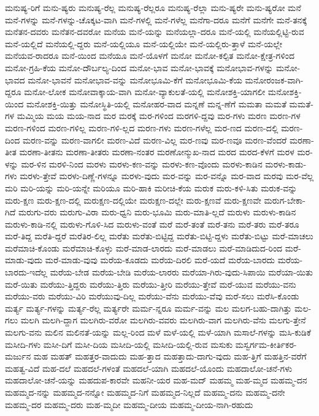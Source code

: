 {ಮನುಷ್ಯ-ರಿಗೆ
ಮನು-ಷ್ಯರು
ಮನುಷ್ಯ-ರೆಲ್ಲ
ಮನುಷ್ಯ-ರೆಲ್ಲರೂ
ಮನುಷ್ಯ-ರೆಲ್ಲಾ
ಮನು-ಷ್ಯರೇ
ಮನು-ಷ್ಯರೋ
ಮನೆ
ಮನೆ-ಗಳನ್ನು
ಮನೆ-ಗಳನ್ನು-ಚೊಕ್ಕಟ-ವಾಗಿ
ಮನೆ-ಗಳಲ್ಲಿ
ಮನೆ-ಗಳೆಲ್ಲ
ಮನೆಗಾ-ದರೂ
ಮನೆಗೆ
ಮನೆಗೇ
ಮನೆ-ತನಕ್ಕೆ
ಮನೆತನ-ದವರು
ಮನೆತನ-ದವರೋ
ಮನೆಯ
ಮನೆ-ಯನ್ನು
ಮನೆಯಲ್ಲಾ-ದರೂ
ಮನೆ-ಯಲ್ಲಿ
ಮನೆಯಲ್ಲಿಟ್ಟಿ-ರುವ
ಮನೆ-ಯಲ್ಲಿದೆ
ಮನೆಯಲ್ಲಿ-ದ್ದರು
ಮನೆ-ಯಲ್ಲಿಯೂ
ಮನೆ-ಯಲ್ಲಿಯೇ
ಮನೆ-ಯಲ್ಲಿರು-ತ್ತಾಳೆ
ಮನೆ-ಯಲ್ಲೇ
ಮನೆಯವ-ರಾದರೂ
ಮನೆ-ಯಿಂದ
ಮನೆಯೂ
ಮನೆ-ಯೊಳಗೆ
ಮನೋ
ಮನೋ-ಕಲ್ಪಿತ
ಮನೋ-ಕ್ಷೇತ್ರ-ಗಳಿಂದ
ಮನೋ-ಗ್ರಹಿ-ಕೆಯ
ಮನೋ-ದೌರ್ಬಲ್ಯ-ದಿಂದ
ಮನೋ-ಭಾವ
ಮನೋ-ಭಾವಕ್ಕೆ
ಮನೋಭಾವ-ಗಳನ್ನು
ಮನೋ-ಭಾವದ
ಮನೋ-ಭಾವನೆ
ಮನೋಭಾವ-ವನ್ನು
ಮನೋಭೂಮಿ-ಕೆಗೆ
ಮನೋಭೂಮಿ-ಕೆಯ
ಮನೋರಂಜಕ-ವಾಗಿ-ದ್ದರೂ
ಮನೋ-ಲೋಕ
ಮನೋವಾಕ್ಕಾಯ-ವಾಗಿ
ಮನೋ-ವ್ಯಾಕುಲತೆ-ಯಲ್ಲಿ
ಮನೋಶಕ್ತಿ-ಯಾಗಲೀ
ಮನೋಶಕ್ತಿ-ಯಿಂದ
ಮನೋಶಕ್ತಿ-ಯಿತ್ತು
ಮನೋಸ್ಥಿತಿ-ಯಲ್ಲಿ
ಮನೋಹರ-ವಾದ
ಮನ್ನಣೆ
ಮನ್ನ-ಣೆಗೆ
ಮಮತಾ
ಮಮತೆ
ಮಮತೆ-ಗಳ
ಮಮ್ಮಿಯ
ಮಯ
ಮಯ-ನಾದ
ಮರ
ಮರಕ್ಕೆ
ಮರ-ಗಳಿಂದ
ಮರಗಳಿ-ದ್ದವು
ಮರ-ಗಳು
ಮರಣ
ಮರಣ-ಗಳ
ಮರಣ-ಗಳಿಂದ
ಮರಣ-ಗಳಿಲ್ಲ
ಮರಣ-ಗಳಿ-ಲ್ಲದ
ಮರಣ-ಗಳು
ಮರಣ-ಗಳೆಲ್ಲ
ಮರ-ಣದ
ಮರಣ-ದಲ್ಲಿ
ಮರಣ-ದಿಂದ
ಮರಣ-ವನ್ನು
ಮರಣ-ವಾಗಲೀ
ಮರಣ-ವಿದೆ
ಮರಣ-ವಿಲ್ಲ
ಮರ-ಣವು
ಮರ-ಣವೂ
ಮರಣ-ವೆಂದರೆ
ಮರಣಾ-ತೀತ
ಮರಣಾ-ತೀತನು
ಮರಣಾ-ತೀತರು
ಮರಣಾ-ನಂತರ
ಮರಣೋನ್ಮುಖ-ನಾದ
ಮರದ
ಮರದ-ಕೆಳಗೆ
ಮರಳ
ಮರ-ಳನ್ನು
ಮರ-ಳಿನ
ಮರಳಿ-ನಿಂದ
ಮರಳು
ಮರಳು-ಕಣ-ವನ್ನು
ಮರಳು-ಕಣ-ವೊಂದು
ಮರಳು-ಕಾಡಿನ
ಮರಳು-ಕಾಡು-ಗಳು
ಮರಳು-ತ್ತೇವೆ
ಮರಳು-ದಿಣ್ಣೆ-ಗಳನ್ನೂ
ಮರಳು-ವುದು
ಮರ-ವನ್ನು
ಮರ-ವನ್ನೊ
ಮರ-ವಾದ
ಮರವು
ಮರ-ವೆಲ್ಲ
ಮರಿ
ಮರಿ-ಯನ್ನು
ಮರಿ-ಯನ್ನೇ
ಮರಿಯೂ
ಮರಿ-ಹಾಕಿ
ಮರೀಚಿ-ಕೆಯ
ಮರುಕ
ಮರು-ಕಳಿ-ಸಿತು
ಮರುಕ-ವನ್ನು
ಮರು-ಕ್ಷಣ
ಮರು-ಕ್ಷಣ-ದಲ್ಲಿ
ಮರುಕ್ಷಣ-ದಲ್ಲಿಯೇ
ಮರುಕ್ಷಣ-ದಲ್ಲೇ
ಮರು-ಕ್ಷಣವೆ
ಮರು-ಕ್ಷಣವೇ
ಮರುಗ-ಬೇಕಾ-ಗಿದೆ
ಮರುಗು-ವರು
ಮರುಗು-ವಿರಾ
ಮರು-ಧ್ವನಿ
ಮರು-ಭೂಮಿ
ಮರು-ಮಾತಿ-ಲ್ಲದೆ
ಮರುಳು
ಮರುಳು-ಕಾಡಿನ
ಮರುಳು-ಕಾಡಿ-ನಲ್ಲಿ
ಮರುಳು-ಗೊಳಿ-ಸಿದ
ಮರುಳು-ವಂತೆ
ಮರೆ
ಮರೆ-ತಂತೆ
ಮರೆ-ತನು
ಮರೆ-ತರು
ಮರೆ-ತರೂ
ಮರೆ-ತಿದ್ದ
ಮರೆತಿ-ದ್ದರೆ
ಮರೆತಿರ-ಲಿಲ್ಲ
ಮರೆತು
ಮರೆತು-ಬಿಟ್ಟಿದ್ದ
ಮರೆತು-ಬಿಟ್ಟಿ-ದ್ದಳು
ಮರೆತು-ಬಿಟ್ಟು
ಮರೆ-ಮಾಚಲು
ಮರೆಮಾಚಿ-ಕೊಂಡು
ಮರೆಮಾಚಿ-ಕೊಳ್ಳು
ಮರೆ-ಮಾಡ-ಲಾರದು
ಮರೆ-ಮಾಡಲು
ಮರೆ-ಮಾಡಿದುದ-ರಿಂದ
ಮರೆ-ಮಾಡು-ವುದು
ಮರೆ-ಮಾಡು-ವುವು
ಮರೆಯ-ಕೂಡದು
ಮರೆಯ-ದಿರಲಿ
ಮರೆ-ಯದೆ
ಮರೆಯ-ಬಾರದು
ಮರೆಯ-ಬಾರದು-ಇದೆಲ್ಲ
ಮರೆಯ-ಬೇಡ
ಮರೆಯ-ಬೇಡಿ
ಮರೆಯ-ಲಾರರು
ಮರೆಯಾ-ಗಿರು-ವುದು-ಸಿಪಾಯಿ
ಮರೆಯಾ-ಯಿತು
ಮರೆ-ಯಿತು
ಮರೆಯು-ತ್ತಿದ್ದರು
ಮರೆಯು-ತ್ತಿರು
ಮರೆಯು-ತ್ತೀರಿ
ಮರೆಯು-ತ್ತೇವೆ
ಮರೆ-ಯುವ
ಮರೆಯು-ವನು
ಮರೆಯು-ವರು
ಮರೆಯು-ವಿರಿ
ಮರೆಯುವು-ದಿಲ್ಲ
ಮರೆಯು-ವೆನು
ಮರೆಯು-ವೆವು
ಮರೆ-ಸಲು
ಮರೆಸಿ-ಕೊಂಡು
ಮರ್ತ್ಯ
ಮರ್ತ್ಯ-ಗಳನ್ನು
ಮರ್ತ್ಯ-ರೆಲ್ಲ
ಮರ್ತ್ಯರೇ
ಮರ್ಮ-ನ್ನರೂ
ಮರ್ಮ-ವನ್ನು
ಮಲ
ಮಲಗ-ಬಹು-ದಾಗಿತ್ತು
ಮಲ-ಗಲು
ಮಲಗಿ
ಮಲಗಿ-ದ್ದಾಗ
ಮಲಗಿರು-ವರೋ
ಮಲಗಿರು-ವವರು
ಮಲಗಿರು-ವಾಗ
ಮಲಗಿರು-ವೆನು
ಮಲಗು-ತ್ತೇನೆ
ಮಲಗು-ವನು
ಮಲಿನ
ಮಲಿನತೆ-ಯನ್ನು
ಮಲ್ಲ-ರಿಂದ
ಮಳೆ
ಮಳೆ-ಯಲ್ಲಿ
ಮಳೆ-ಯಾಗಿ
ಮಸಾಲೆ-ಗಳನ್ನು
ಮಸಿ-ಕುಡಿಕೆ
ಮಸೀದಿ-ಗಳು
ಮಸೀ-ದಿಗೆ
ಮಸೀ-ದಿಯ
ಮಸೀದಿ-ಯಲ್ಲಿ
ಮಸೀದಿ-ಯಲ್ಲಿ-ರುವ
ಮಸುಕು
ಮಸ್ವರ್ಗಮ-ಕೀರ್ತಿಕರ-ಮರ್ಜುನ
ಮಹ
ಮಹತ್
ಮಹತ್ತರ-ವಾದುದು
ಮಹ-ತ್ತಾದ
ಮಹತ್ತಾದು-ದಾಗು-ವುದು
ಮಹ-ತ್ತಿಗೆ
ಮಹತ್ತಿನ-ವರೆಗೆ
ಮಹತ್ವ-ವಿದೆ
ಮಹ-ದಲೆ
ಮಹದಲೆ-ಗಳಂತೆ
ಮಹದಲೆ-ಯಾಗಿ
ಮಹದಲೆ-ಯೊಂದು
ಮಹದಾಲೋ-ಚನೆ-ಗಳು
ಮಹದಾಲೋ-ಚನೆ-ಯನ್ನು
ಮಹದುಪ-ಕಾರವೇ
ಮಹನೀ-ಯರ
ಮಹ-ಮದ್
ಮಹಮ್ಮ
ಮಹ-ಮ್ಮದ
ಮಹಮ್ಮ-ದನ
ಮಹಮ್ಮದ-ನನ್ನು
ಮಹಮ್ಮದ-ನನ್ನೋ
ಮಹಮ್ಮದ-ನಿಗೆ
ಮಹಮ್ಮದ-ನಿಲ್ಲದೆ
ಮಹಮ್ಮ-ದನು
ಮಹಮ್ಮ-ದನೇ
ಮಹಮ್ಮ-ದರ
ಮಹಮ್ಮ-ದರು
ಮಹ-ಮ್ಮದೀ
ಮಹಮ್ಮ-ದೀಯ
ಮಹಮ್ಮ-ದೀಯ-ನಾಗಿ-ರಹುದು
}
